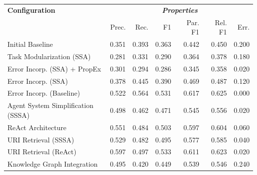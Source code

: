 \documentclass[a4paper,oneside,bibliography=totoc]{scrbook}
\begin{document}
\begin{table}[h]
  \centering
  \begin{tabular}{p{4cm}|rrrrrr}
    \toprule
    \textbf{Configuration}               & \multicolumn{6}{c}{\textit{\textbf{Properties}}}                                                                                      \\
                                         & Prec.                                            & Rec.           & F1             & Par. F1        & Rel. F1        & Err.           \\
    \midrule
    Initial Baseline                     & 0.351                                            & 0.393          & 0.363          & 0.442          & 0.450          & 0.200          \\
    Task Modularization (SSA)            & 0.281                                            & 0.331          & 0.290          & 0.364          & 0.378          & 0.180          \\
    Error Incorp. (SSA) + PropEx         & 0.301                                            & 0.294          & 0.286          & 0.345          & 0.358          & 0.020          \\
    Error Incorp. (SSA)                  & 0.378                                            & 0.445          & 0.390          & 0.469          & 0.487          & 0.120          \\
    Error Incorp. (Baseline)             & 0.522                                            & 0.564          & 0.531          & 0.617          & 0.625          & 0.000          \\
    Agent System Simplification (SSSA)   & 0.498                                            & 0.462          & 0.471          & 0.545          & 0.556          & 0.020          \\
    ReAct Architecture                   & 0.551                                            & 0.484          & 0.503          & 0.597          & 0.604          & 0.060          \\
    \ac{URI} Retrieval (SSSA)            & 0.529                                            & 0.482          & 0.495          & 0.577          & 0.585          & 0.040          \\
    \ac{URI} Retrieval (ReAct)           & 0.597                                            & 0.497          & 0.533          & 0.611          & 0.623          & 0.020          \\
    Knowledge Graph Integration          & 0.495                                            & 0.420          & 0.449          & 0.539          & 0.546          & 0.240          \\

\end{tabular}
\end{table}
\end{document}
